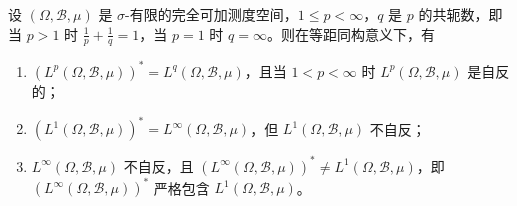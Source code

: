\documentclass[../../main.tex]{subfiles}%
\begin{document}
\begin{proposition}\label{proposition:Lp对偶与自反性}
设 $(\Omega,\mathscr{B},\mu)$ 是 $\sigma$-有限的完全可加测度空间，$1\leqslant p<\infty$，$q$ 是 $p$ 的共轭数，即当 $p>1$ 时 $\frac{1}{p}+\frac{1}{q}=1$，当 $p=1$ 时 $q=\infty$。则在等距同构意义下，有
\begin{enumerate}[(1)]
\item $(L^p(\Omega,\mathscr{B},\mu))^*=L^q(\Omega,\mathscr{B},\mu)$，且当 $1<p<\infty$ 时 $L^p(\Omega,\mathscr{B},\mu)$ 是自反的；

\item $(L^1(\Omega,\mathscr{B},\mu))^*=L^\infty(\Omega,\mathscr{B},\mu)$，但 $L^1(\Omega,\mathscr{B},\mu)$ 不自反；

\item $L^\infty(\Omega,\mathscr{B},\mu)$ 不自反，且 $(L^\infty(\Omega,\mathscr{B},\mu))^*\neq L^1(\Omega,\mathscr{B},\mu)$，即 $(L^\infty(\Omega,\mathscr{B},\mu))^*$ 严格包含 $L^1(\Omega,\mathscr{B},\mu)$。
\end{enumerate}
\end{proposition}
\end{document}
